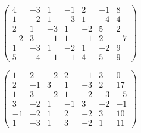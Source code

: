 \documentclass[12pt]{exam}
\theoremstyle{definition}
\begin{document}
\begin{questions}
\question $\begin{pmatrix}
4 & -3 & 1 & -1 & 2 & -1 & 8 \\
1 & -2 & 1 & -3 & 1 & -4 & 4 \\
2 & 1 & -3 & 1 & -2 & 5 & 2 \\
-2 & 3 & -1 & 1 & -1 & 2 & -7 \\
1 & -3 & 1 & -2 & 1 & -2 & 9 \\
5 & -4 & -1 & -1 & 4 & 5 & 9
\end{pmatrix}$

\question $\begin{pmatrix}
1 & 2 & -2 & 2 & -1 & 3 & 0 \\
2 & -1 & 3 & 1 & -3 & 2 & 17 \\
1 & 3 & -2 & 1 & -2 & -3 & -5 \\
3 & -2 & 1 & -1 & 3 & -2 & -1 \\
-1 & -2 & 1 & 2 & -2 & 3 & 10 \\
1 & -3 & 1 & 3 & -2 & 1 & 11
\end{pmatrix}$

\end{questions}
\end{document}
